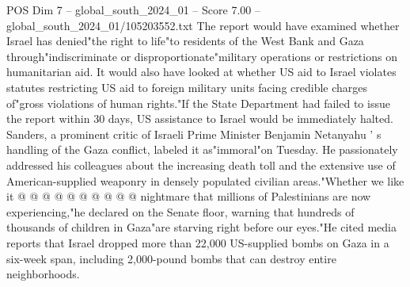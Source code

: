 \begin{textsample}{POS Dim 7 – global\_south\_2024\_01 – Score 7.00 – global\_south\_2024\_01/105203552.txt}
The report would have examined whether Israel has denied"the right to life"to residents of the West Bank and Gaza through"indiscriminate or disproportionate"military operations or restrictions on humanitarian aid.
It would also have looked at whether US aid to Israel violates statutes restricting US aid to foreign military units facing credible charges of"gross violations of human rights."If the State Department had failed to issue the report within 30 days, US assistance to Israel would be immediately halted.
Sanders, a prominent critic of Israeli Prime Minister Benjamin Netanyahu ' s handling of the Gaza conflict, labeled it as"immoral"on Tuesday.
He passionately addressed his colleagues about the increasing death toll and the extensive use of American-supplied weaponry in densely populated civilian areas."Whether we like it @ @ @ @ @ @ @ @ @ @ nightmare that millions of Palestinians are now experiencing,"he declared on the Senate floor, warning that hundreds of thousands of children in Gaza"are starving right before our eyes."He cited media reports that Israel dropped more than 22,000 US-supplied bombs on Gaza in a six-week span, including 2,000-pound bombs that can destroy entire neighborhoods.

\end{textsample}
